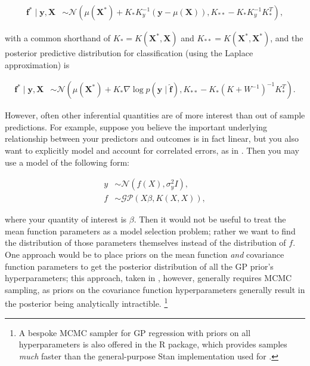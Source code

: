 \documentclass{draft}
\begin{document}
\vspace*{-\baselineskip}
\begin{align}
    \mathbf{f}^\ast \mid \mathbf{y}, \mathbf{X}
    & \sim \mathcal{N} \left( \mu \left( \mathbf{X}^\ast \right) + K_\ast K_y^{-1} \left( \mathbf{y} - \mu \left( \mathbf{X} \right) \right), K_{\ast\ast} - K_\ast K_y^{-1} K_\ast^T \right),
\end{align}

\noindent
with a common shorthand of \( K_\ast = K \left( \mathbf{X}^\ast, \mathbf{X} \right) \)
and \( K_{\ast\ast} = K \left( \mathbf{X}^\ast, \mathbf{X}^\ast \right) \),
and the posterior predictive distribution for classification (using the Laplace approximation) is

\vspace*{-\baselineskip}
\begin{align}
    \mathbf{f}^\ast \mid \mathbf{y}, \mathbf{X}
    & \sim \mathcal{N} \left( \mu \left( \mathbf{X}^\ast \right) + K_\ast \nabla \log p \left( \mathbf{y} \mid \hat{\mathbf{f}} \right), K_{\ast\ast} - K_\ast \left( K + W^{-1} \right)^{-1} K_\ast^T \right).
\end{align}

However, often other inferential quantities are of more interest than out of sample predictions.
For example, suppose you believe the important underlying relationship between your predictors and outcomes is in fact linear,
but you also want to explicitly model and account for correlated errors, as in \citet{Carlson2020Modeling}.
Then you may use a model of the following form:

\vspace*{-\baselineskip}
\begin{align}
    y & \sim \mathcal{N} \left( f \left( X \right), \sigma_y^2 I \right), \\
    f & \sim \mathcal{GP} \left( X \beta, K \left( X, X \right) \right),
\end{align}

\noindent
where your quantity of interest is \( \beta \).
Then it would not be useful to treat the mean function parameters as a model selection problem;
rather we want to find the distribution of those parameters themselves instead of the distribution of \( f \).
One approach would be to place priors on the mean function \emph{and} covariance function parameters
to get the posterior distribution of all the GP prior's hyperparameters;
this approach, taken in \citet{Carlson2020Modeling}, however, generally requires MCMC sampling,
as priors on the covariance function hyperparameters generally result in the posterior being analytically intractible.%
\footnote{
    A bespoke MCMC sampler for GP regression with priors on all hyperparameters is also offered in the R package,
    which provides samples \emph{much} faster than the general-purpose Stan implementation used for \citet{Carlson2020Modeling}.
}
\end{document}

